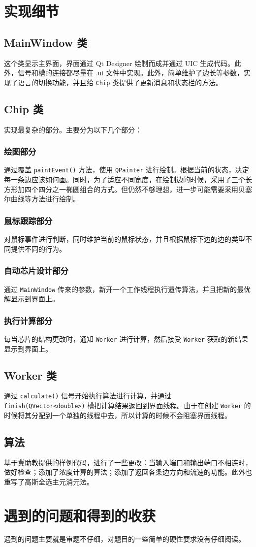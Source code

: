 \documentclass[11pt]{article}
\begin{document}
\section{实现细节}
\label{sec:org9441586}
\subsection{MainWindow 类}
\label{sec:org714391f}
这个类显示主界面，界面通过 Qt Designer 绘制而成并通过 UIC 生成代码。此外，信号和槽的连接都尽量在 .ui 文件中实现。此外，简单维护了边长等参数，实现了语言的切换功能，并且给 \texttt{Chip} 类提供了更新消息和状态栏的方法。
\subsection{Chip 类}
\label{sec:org5d0c565}
实现最复杂的部分。主要分为以下几个部分：
\subsubsection{绘图部分}
\label{sec:org3f96fcf}
通过覆盖 \texttt{paintEvent()} 方法，使用 \texttt{QPainter} 进行绘制。根据当前的状态，决定每一条边应该如何画。同时，为了适应不同宽度，在绘制边的时候，采用了三个长方形加四个四分之一椭圆组合的方式。但仍然不够理想，进一步可能需要采用贝塞尔曲线等方法进行绘制。
\subsubsection{鼠标跟踪部分}
\label{sec:orgc6a118d}
对鼠标事件进行判断，同时维护当前的鼠标状态，并且根据鼠标下边的边的类型不同提供不同的行为。
\subsubsection{自动芯片设计部分}
\label{sec:org4b3b434}
通过 \texttt{MainWindow} 传来的参数，新开一个工作线程执行遗传算法，并且把新的最优解显示到界面上。
\subsubsection{执行计算部分}
\label{sec:orgbd3b596}
每当芯片的结构更改时，通知 \texttt{Worker} 进行计算，然后接受 \texttt{Worker} 获取的新结果显示到界面上。
\subsection{Worker 类}
\label{sec:orgb339104}
通过 \texttt{calculate()} 信号开始执行算法进行计算，并通过 \texttt{finish(QVector<double>)} 槽把计算结果返回到界面线程。由于在创建 \texttt{Worker} 的时候将其分配到一个单独的线程中去，所以计算的时候不会阻塞界面线程。
\subsection{算法}
\label{sec:org16d133d}
基于冀助教提供的样例代码，进行了一些更改：当输入端口和输出端口不相连时，做好检查；添加了浓度计算的算法；添加了返回各条边方向和流速的功能。此外也重写了高斯全选主元消元法。

\section{遇到的问题和得到的收获}
\label{sec:orgc162836}
遇到的问题主要就是审题不仔细，对题目的一些简单的硬性要求没有仔细阅读。
\end{document}
